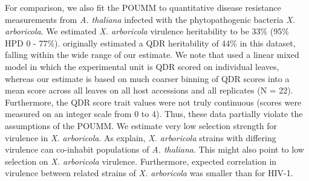 \documentclass[11pt]{article}
\begin{document}
\begin{linenumbers}
For comparison, we also fit the POUMM to quantitative disease resistance measurements from \emph{A. thaliana} infected with the phytopathogenic bacteria \emph{X. arboricola}. We estimated \emph{X. arboricola} virulence heritability to be 33\% (95\% HPD 0 - 77\%). \citep{Wang2018Two-wayGenomes} originally estimated a QDR heritability of 44\% in this dataset, falling within the wide range of our estimate. We note that \cite{Wang2018Two-wayGenomes} used a linear mixed model in which the experimental unit is QDR scored on individual leaves, whereas our estimate is based on much coarser binning of QDR scores into a mean score across all leaves on all host accessions and all replicates (N = 22). Furthermore, the QDR score trait values were not truly continuous (scores were measured on an integer scale from 0 to 4). Thus, these data partially violate the assumptions of the POUMM. We estimate very low selection strength for virulence in \emph{X. arboricola}. As \cite{Wang2018Two-wayGenomes} explain, \emph{X. arboricola} strains with differing virulence can co-inhabit populations of \emph{A. thaliana}. This might also point to low selection on \emph{X. arboricola} virulence. Furthermore, expected correlation in virulence between related strains of \emph{X. arboricola} was smaller than for HIV-1.


\end{linenumbers}
\end{document}
